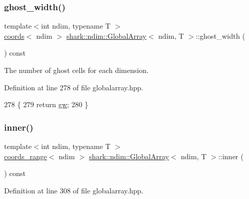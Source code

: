 \subsubsection{\texorpdfstring{ghost\+\_\+width()}{ghost\_width()}}
{\footnotesize\ttfamily template$<$int ndim, typename T $>$ \\
\hyperlink{structshark_1_1ndim_1_1coords}{coords}$<$ ndim $>$ \hyperlink{classshark_1_1ndim_1_1_global_array}{shark\+::ndim\+::\+Global\+Array}$<$ ndim, T $>$\+::ghost\+\_\+width (\begin{DoxyParamCaption}{ }\end{DoxyParamCaption}) const\hspace{0.3cm}{\ttfamily [inline]}}

The number of ghost cells for each dimension. 

Definition at line 278 of file globalarray.\+hpp.


\begin{DoxyCode}
278                                                                    \{
279             \textcolor{keywordflow}{return} \hyperlink{classshark_1_1ndim_1_1_global_array_a38d93d114d585e5e5491c5ecd35c6bfc}{gw};
280         \}
\end{DoxyCode}
\hypertarget{classshark_1_1ndim_1_1_global_array_a9bba546920e1709b492540d4ef0b0129}{}\label{classshark_1_1ndim_1_1_global_array_a9bba546920e1709b492540d4ef0b0129} 
\subsubsection{\texorpdfstring{inner()}{inner()}}
{\footnotesize\ttfamily template$<$int ndim, typename T $>$ \\
\hyperlink{structshark_1_1ndim_1_1coords__range}{coords\+\_\+range}$<$ ndim $>$ \hyperlink{classshark_1_1ndim_1_1_global_array}{shark\+::ndim\+::\+Global\+Array}$<$ ndim, T $>$\+::inner (\begin{DoxyParamCaption}{ }\end{DoxyParamCaption}) const\hspace{0.3cm}{\ttfamily [inline]}}



Definition at line 308 of file globalarray.\+hpp.


